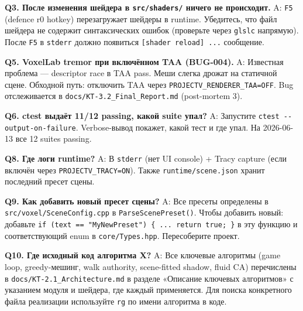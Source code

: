 \textbf{Q3. После изменения шейдера в \texttt{src/shaders/} ничего не происходит.}
A: \texttt{F5} (defence r0 hotkey) перезагружает шейдеры в runtime. Убедитесь, что файл шейдера не содержит синтаксических ошибок (проверьте через \texttt{glslc} напрямую). После \texttt{F5} в \texttt{stderr} должно появиться \texttt{{[}shader\ reload{]}\ ...} сообщение.

\textbf{Q5. VoxelLab tremor при включённом TAA (BUG-004).}
A: Известная проблема --- descriptor race в TAA pass. Меши слегка дрожат на статичной сцене. Обходной путь: отключить TAA через \texttt{PROJECTV\_RENDERER\_TAA=OFF}. Bug отслеживается в \texttt{docs/KT-3.2\_Final\_Report.md} (post-mortem 3).

\textbf{Q6. ctest выдаёт 11/12 passing, какой suite упал?}
A: Запустите \texttt{ctest\ -\/-output-on-failure}. Verbose-вывод покажет, какой тест и где упал. На 2026-06-13 все 12 suites passing.

\textbf{Q8. Где логи runtime?}
A: В \texttt{stderr} (нет UI console) + Tracy capture (если включён через \texttt{PROJECTV\_TRACY=ON}). Также \texttt{runtime/scene.json} хранит последний пресет сцены.

\textbf{Q9. Как добавить новый пресет сцены?}
A: Все пресеты определены в \texttt{src/voxel/SceneConfig.cpp} в \texttt{ParseScenePreset()}. Чтобы добавить новый: добавьте \texttt{if\ (text\ ==\ "MyNewPreset")\ \{\ ...\ return\ true;\ \}} в эту функцию и соответствующий enum в \texttt{core/Types.hpp}. Пересоберите проект.

\textbf{Q10. Где исходный код алгоритма X?}
A: Все ключевые алгоритмы (game loop, greedy-мешинг, walk authority, scene-fitted shadow, fluid CA) перечислены в \texttt{docs/KT-2.1\_Architecture.md} в разделе «Описание ключевых алгоритмов» с указанием модуля и шейдера, где каждый применяется. Для поиска конкретного файла реализации используйте \texttt{rg} по имени алгоритма в коде.

